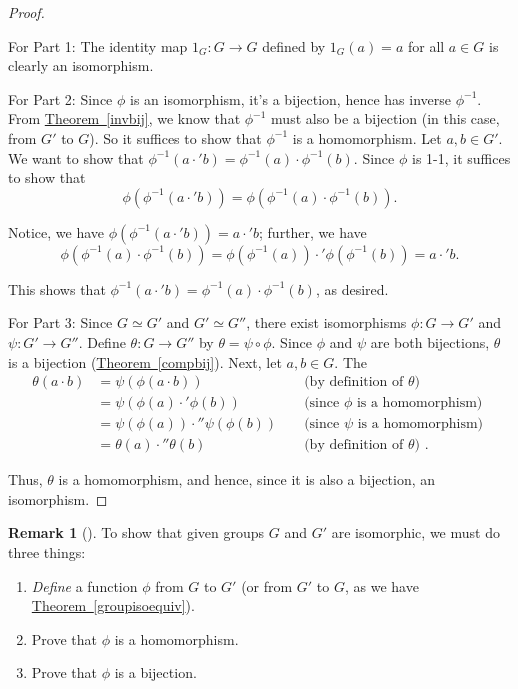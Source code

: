 \documentclass[10pt,]{book}
\theoremstyle{plain}
\theoremstyle{definition}
\theoremstyle{definition}
\newtheorem{remark}[theorem]{Remark}
\theoremstyle{definition}
\theoremstyle{definition}
\numberwithin{equation}{section}
\newcommand{\amp}{&}
\begin{document}
\begin{proof}\hypertarget{proof-16}{}
For Part 1: The identity map \(1_G:G\to G\) defined by \(1_G(a)=a\) for all \(a\in G\) is clearly an isomorphism.%
\par
For Part 2: Since \(\phi\) is an isomorphism, it's a bijection, hence has inverse \(\phi^{-1}\). From \hyperref[invbij]{Theorem~\ref{invbij}}, we know that \(\phi^{-1}\) must also be a bijection (in this case, from \(G'\) to \(G\)). So it suffices to show that \(\phi^{-1}\) is a homomorphism. Let \(a,b\in G'\). We want to show that \(\phi^{-1}(a\cdot'b)=\phi^{-1}(a)\cdot\phi^{-1}(b)\). Since \(\phi\) is 1-1, it suffices to show that%
\begin{equation*}
\phi(\phi^{-1}(a\cdot'b))=\phi(\phi^{-1}(a)\cdot\phi^{-1}(b)).
\end{equation*}
%
\par
Notice, we have \(\phi(\phi^{-1}(a\cdot'b))=a\cdot'b\); further, we have%
\begin{equation*}
\phi(\phi^{-1}(a)\cdot\phi^{-1}(b))=\phi(\phi^{-1}(a))\cdot'\phi(\phi^{-1}(b))=a\cdot'b.
\end{equation*}
%
\par
This shows that \(\phi^{-1}(a\cdot'b)=\phi^{-1}(a)\cdot\phi^{-1}(b)\), as desired.%
\par
For Part 3: Since \(G\simeq G'\) and \(G'\simeq G''\), there exist isomorphisms \(\phi:G\to G'\) and \(\psi:G'\to G''\). Define \(\theta:G\to G''\) by \(\theta=\psi \circ \phi\). Since \(\phi\) and \(\psi\) are both bijections, \(\theta\) is a bijection (\hyperref[compbij]{Theorem~\ref{compbij}}). Next, let \(a,b\in G\). The%
\begin{align*}
\theta(a\cdot b)\amp =\psi(\phi(a\cdot b))\amp \amp \text{ (by definition of \(\theta\)) }\\
\amp =\psi(\phi(a)\cdot'\phi(b))\amp \amp \text{ (since \(\phi\) is a homomorphism) }\\
\amp =\psi(\phi(a))\cdot''\psi(\phi(b))\amp \amp \text{ (since \(\psi\) is a homomorphism) }\\
\amp =\theta(a)\cdot''\theta(b)\amp \amp \text{ (by definition of \(\theta\)) } .
\end{align*}
%
\par
Thus, \(\theta\) is a homomorphism, and hence, since it is also a bijection, an isomorphism.%
\end{proof}
\begin{remark}[]\label{remark-17}
To show that given groups \(G\) and \(G'\) are isomorphic, we must do three things: \leavevmode%
\begin{enumerate}
\item\hypertarget{li-138}{}\emph{Define} a function \(\phi\) from \(G\) to \(G'\) (or from \(G'\) to \(G\), as we have \hyperref[groupisoequiv]{Theorem~\ref{groupisoequiv}}).%
\item\hypertarget{li-139}{}Prove that \(\phi\) is a homomorphism.%
\item\hypertarget{li-140}{}Prove that \(\phi\) is a bijection.%
\end{enumerate}
%
\end{remark}
\end{document}
